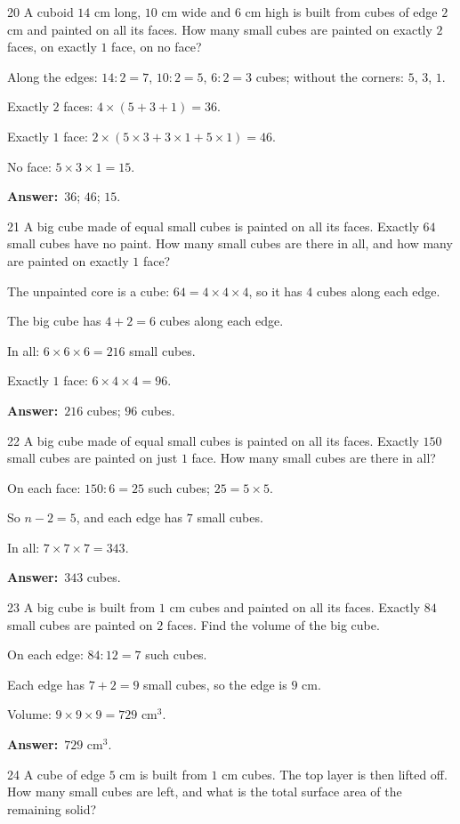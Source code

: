 \documentclass[11pt]{article}
\newif\ifsol \solfalse
\providecommand{\AnsWord}{Đáp số}
\newcommand{\dapso}[1]{\par\textbf{\AnsWord:}\ #1}
\newcommand{\probsol}[1]{%
  \begin{lrbox}{\solmeasure}\begin{minipage}{\dimexpr\linewidth-24pt\relax}#1\end{minipage}\end{lrbox}%
  \ifsol
    \begin{solbox}#1\end{solbox}%
  \else
    \setlength{\solht}{\dimexpr\ht\solmeasure+\dp\solmeasure+0.85cm\relax}%
    \ifdim\solht<1.35cm\setlength{\solht}{1.35cm}\fi
    \begin{tcolorbox}[colback=white,colframe=Line,boxrule=0.8pt,arc=5pt,
      left=8pt,right=8pt,top=4pt,bottom=4pt,height=\solht]{\footnotesize\color{Slate}\itshape\WorkWord}\end{tcolorbox}%
  \fi}
\newcommand{\gap}{\vspace{0.3cm}}
\def\WorkWord{Your work:}
\def\AnsWord{Answer}
\begin{document}
\gap
\begin{probbox}{20}{\relax}
A cuboid $14$ cm long, $10$ cm wide and $6$ cm high is built from cubes of edge $2$ cm and painted on all its faces. How many small cubes are painted on exactly $2$ faces, on exactly $1$ face, on no face?
\end{probbox}
\probsol{
Along the edges: $14:2=7$, $10:2=5$, $6:2=3$ cubes; without the corners: $5$, $3$, $1$.\par
Exactly $2$ faces: $4\times(5+3+1)=36$.\par
Exactly $1$ face: $2\times(5\times3+3\times1+5\times1)=46$.\par
No face: $5\times3\times1=15$.
\dapso{$36$; $46$; $15$.}}
\gap
\begin{probbox}{21}{\relax}
A big cube made of equal small cubes is painted on all its faces. Exactly $64$ small cubes have no paint. How many small cubes are there in all, and how many are painted on exactly $1$ face?
\end{probbox}
\probsol{
The unpainted core is a cube: $64=4\times4\times4$, so it has $4$ cubes along each edge.\par
The big cube has $4+2=6$ cubes along each edge.\par
In all: $6\times6\times6=216$ small cubes.\par
Exactly $1$ face: $6\times4\times4=96$.
\dapso{$216$ cubes; $96$ cubes.}}
\gap
\begin{probbox}{22}{\relax}
A big cube made of equal small cubes is painted on all its faces. Exactly $150$ small cubes are painted on just $1$ face. How many small cubes are there in all?
\end{probbox}
\probsol{
On each face: $150:6=25$ such cubes; $25=5\times5$.\par
So $n-2=5$, and each edge has $7$ small cubes.\par
In all: $7\times7\times7=343$.
\dapso{$343$ cubes.}}
\gap
\begin{probbox}{23}{\relax}
A big cube is built from $1$ cm cubes and painted on all its faces. Exactly $84$ small cubes are painted on $2$ faces. Find the volume of the big cube.
\end{probbox}
\probsol{
On each edge: $84:12=7$ such cubes.\par
Each edge has $7+2=9$ small cubes, so the edge is $9$ cm.\par
Volume: $9\times9\times9=729$ cm$^3$.
\dapso{$729$ cm$^3$.}}
\gap
\begin{probbox}{24}{\relax}
A cube of edge $5$ cm is built from $1$ cm cubes. The top layer is then lifted off. How many small cubes are left, and what is the total surface area of the remaining solid?
\end{probbox}
\end{document}
